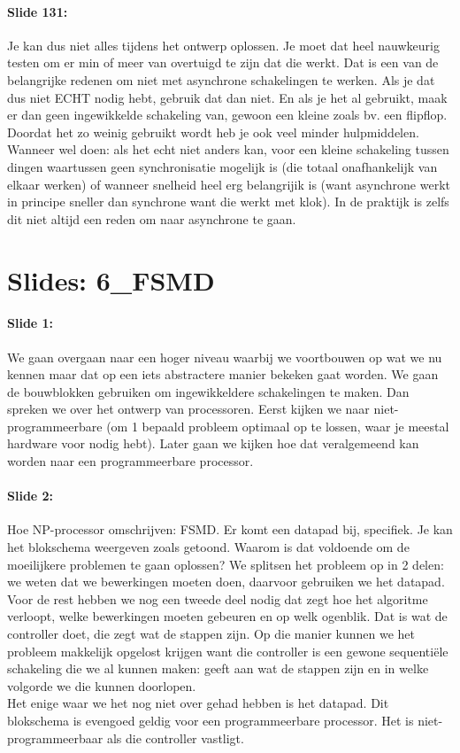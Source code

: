 \documentclass[10pt,a4paper]{book}
\begin{document}
\paragraph{Slide 131:} Je kan dus niet alles tijdens het ontwerp oplossen. Je moet dat heel nauwkeurig testen om er min of meer van overtuigd te zijn dat die werkt. Dat is een van de belangrijke redenen om niet met asynchrone schakelingen te werken. Als je dat dus niet ECHT nodig hebt, gebruik dat dan niet. En als je het al gebruikt, maak er dan geen ingewikkelde schakeling van, gewoon een kleine zoals bv. een flipflop.\\
Doordat het zo weinig gebruikt wordt heb je ook veel minder hulpmiddelen.\\
Wanneer wel doen: als het echt niet anders kan, voor een kleine schakeling tussen dingen waartussen geen synchronisatie mogelijk is (die totaal onafhankelijk van elkaar werken) of wanneer snelheid heel erg belangrijik is (want asynchrone werkt in principe sneller dan synchrone want die werkt met klok). In de praktijk is zelfs dit niet altijd een reden om naar asynchrone te gaan. 

\section{Slides: 6\_FSMD}

\paragraph{Slide 1:} We gaan overgaan naar een hoger niveau waarbij we voortbouwen op wat we nu kennen maar dat op een iets abstractere manier bekeken gaat worden. We gaan de bouwblokken gebruiken om ingewikkeldere schakelingen te maken. Dan spreken we over het ontwerp van processoren. Eerst kijken we naar niet-programmeerbare (om 1 bepaald probleem optimaal op te lossen, waar je meestal hardware voor nodig hebt). Later gaan we kijken hoe dat veralgemeend kan worden naar een programmeerbare processor.

\paragraph{Slide 2:} Hoe NP-processor omschrijven: FSMD. Er komt een datapad bij, specifiek. Je kan het blokschema weergeven zoals getoond. Waarom is dat voldoende om de moeilijkere problemen te gaan oplossen? We splitsen het probleem op in 2 delen: we weten dat we bewerkingen moeten doen, daarvoor gebruiken we het datapad. Voor de rest hebben we nog een tweede deel nodig dat zegt hoe het algoritme verloopt, welke bewerkingen moeten gebeuren en op welk ogenblik. Dat is wat de controller doet, die zegt wat de stappen zijn. Op die manier kunnen we het probleem makkelijk opgelost krijgen want die controller is een gewone sequenti\"ele schakeling die we al kunnen maken: geeft aan wat de stappen zijn en in welke volgorde we die kunnen doorlopen.\\
Het enige waar we het nog niet over gehad hebben is het datapad. Dit blokschema is evengoed geldig voor een programmeerbare processor. Het is niet-programmeerbaar als die controller vastligt.
\end{document}
